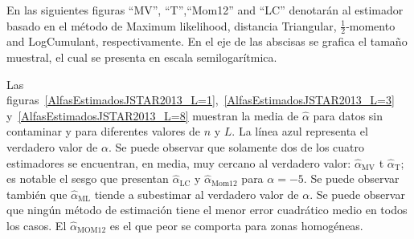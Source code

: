 En las siguientes figuras ``MV'', ``T'',``Mom12'' and ``LC'' denotarán al estimador basado en el método de Maximum likelihood, distancia Triangular, $\frac{1}{2}$-momento and LogCumulant, respectivamente. En el eje de las abscisas se grafica el tamaño muestral, el cual se presenta en escala semilogarítmica.

Las figuras~\ref{AlfasEstimadosJSTAR2013_L=1},~\ref{AlfasEstimadosJSTAR2013_L=3} y~\ref{AlfasEstimadosJSTAR2013_L=8} muestran la media de $\widehat{\alpha}$ para datos sin contaminar y para diferentes valores de $n$ y $L$. La línea azul representa el verdadero valor de $\alpha$. Se puede observar que solamente dos de los cuatro estimadores se encuentran, en media, muy cercano al verdadero valor: $\widehat{\alpha}_{\text{MV}}$ t $\widehat{\alpha}_{\text{T}}$; es notable el sesgo que presentan  $\widehat{\alpha}_{\text{LC}}$ y $\widehat{\alpha}_{\text{Mom12}}$ para $\alpha=-5$. Se puede observar también que $\widehat\alpha_{\text{ML}}$ tiende a subestimar al verdadero valor de $\alpha$.
Se puede observar que ningún método de estimación tiene el menor error cuadrático medio en todos los casos. El $\widehat{\alpha}_{\text{MOM12}}$ es el que peor se comporta para zonas homogéneas.


